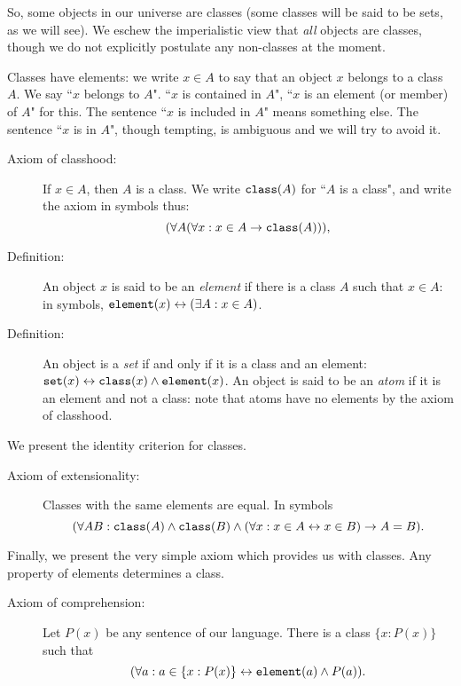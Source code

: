 \documentclass[12pt]{article}
\begin{document}
So, some objects in our universe are classes (some classes will be said to be sets, as we will see).  We eschew the imperialistic view that {\em all\/} objects are classes, though we do not explicitly postulate any non-classes at the moment.

Classes have elements:  we write $x \in A$ to say that an object $x$ belongs to a class $A$.  We say ``$x$ belongs to $A$". ``$x$ is contained in $A$", ``$x$ is an element (or member) of $A$" for this.
The sentence ``$x$ is included in $A$" means something else.  The sentence ``$x$ is in $A$", though tempting, is ambiguous and we will try to avoid it.

\begin{description}

\item[Axiom of classhood:]  If $x \in A$, then $A$ is a class.  We write ${\tt class}(A)$ for ``$A$ is a class", and write the axiom in symbols thus:  $$(\forall A(\forall x:x \in A \rightarrow {\tt class}(A))),$$

\item[Definition:]   An object $x$ is said to be an {\em element} if there is a class $A$ such that $x \in A$:  in symbols, ${\tt element}(x) \leftrightarrow (\exists A:x \in A)$.

\item[Definition:]  An object is a {\em set\/} if and only if it is a class and an element:  ${\tt set}(x) \leftrightarrow {\tt class}(x) \wedge {\tt element}(x)$.  An object is said to be
an {\em atom\/} if it is an element and not a class:  note that atoms have no elements by the axiom of classhood.

\end{description}

We present the identity criterion for classes.

\begin{description}


\item[Axiom of extensionality:]  Classes with the same elements are equal.  In symbols $$(\forall AB:{\tt class}(A) \wedge {\tt class}(B) \wedge (\forall x:x \in A \leftrightarrow x \in B) \rightarrow A=B).$$

\end{description}

Finally, we present the very simple axiom which provides us with classes.  Any property of elements determines a class.

\begin{description}

\item[Axiom of comprehension:]  Let $P(x)$ be any sentence of our language.  There is a class $\{x:P(x)\}$ such that $$(\forall a:a \in \{x:P(x)\} \leftrightarrow {\tt element}(a) \wedge P(a)).$$

\end{description}
\end{document}
